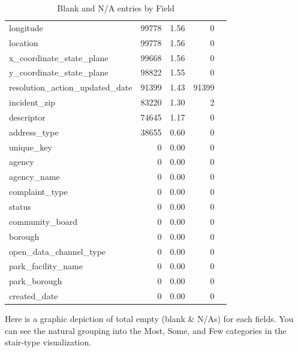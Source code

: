 \documentclass[12pt, titlepage]{article}
\begin{document}
\begin{table}[ht]
{\begin{tabular}{lrrrl}
		longitude & 99778 & 1.56 & 0 \\
		location & 99778 & 1.56 & 0 \\
		x\_coordinate\_state\_plane & 99668 & 1.56 & 0 \\
		y\_coordinate\_state\_plane & 98822 & 1.55 & 0 \\
		resolution\_action\_updated\_date & 91399 & 1.43 & 91399 \\
		incident\_zip & 83220 & 1.30 & 2 \\
		descriptor & 74645 & 1.17 & 0 \\
		address\_type & 38655 & 0.60 & 0 \\
		unique\_key & 0 & 0.00 & 0 \\
		agency & 0 & 0.00 & 0 \\
		agency\_name & 0 & 0.00 & 0 \\
		complaint\_type & 0 & 0.00 & 0 \\
		status & 0 & 0.00 & 0 \\
		community\_board & 0 & 0.00 & 0 \\
		borough & 0 & 0.00 & 0 \\
		open\_data\_channel\_type & 0 & 0.00 & 0 \\
		park\_facility\_name & 0 & 0.00 & 0 \\
		park\_borough & 0 & 0.00 & 0 \\
		created\_date & 0 & 0.00 & 0 \\
	\bottomrule
\end{tabular}
}
\caption{Blank and N/A entries by Field}
\end{table}

\FloatBarrier %

Here is a graphic depiction of total empty (blank \& N/As) for each fields. You can see the natural grouping into the Most, Some, and Few categories
in the stair-type visualization. 
\end{document}
